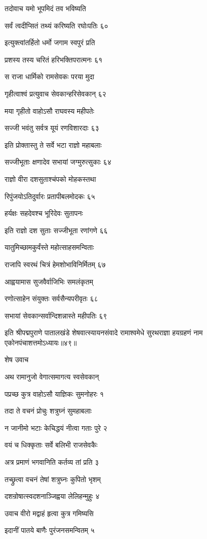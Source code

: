 तदोवाच यमो भूपमिदं तव भविष्यति

सर्वं त्वदीप्सितं तथ्यं करिष्यति रघोःपतिः ६०

इत्युक्त्वांतर्हितो धर्मो जगाम स्वपुरं प्रति

प्रशस्य तस्य चरितं हरिभक्तिपरात्मनः ६१

स राजा धार्मिको रामसेवकः परया मुदा

गृहीत्वाश्वं प्रत्युवाच सेवकान्हरिसेवकान् ६२

मया गृहीतो वाहोऽसौ राघवस्य महीपतेः

सज्जी भवंतु सर्वत्र यूयं रणविशारदाः ६३

इति प्रोक्तास्तु ते सर्वे भटा राज्ञो महाबलाः

सज्जीभूताः क्षणादेव सभायां जग्मुरुत्सुकाः ६४

राज्ञो वीरा दशसुताश्चंपको मोहकस्तथा

रिपुंजयोऽतिदुर्वारः प्रतापीबलमोदकः ६५

हर्यक्षः सहदेवश्च भूरिदेवः सुतापनः

इति राज्ञो दश सुताः सज्जीभूता रणांगणे ६६

यातुमिच्छामकुर्वंस्ते महोत्साहसमन्विताः

राजापि स्वरथं चित्रं हेमशोभाविनिर्मितम् ६७

आह्वयामास सुजवैर्वाजिभिः समलंकृतम्

रणोत्साहेन संयुक्तः सर्वसैन्यपरीवृतः ६८

सभायां सेवकान्सर्वान्दिशन्नास्ते महीपतिः ६९

इति श्रीपद्मपुराणे पातालखंडे शेषवात्स्यायनसंवादे रामाश्वमेधे सुरथराज्ञा हयग्रहणं नाम एकोनपंचाशत्तमोऽध्यायः॥४९॥


शेष उवाच

अथ रामानुजो वेगात्समागत्य स्वसेवकान्

पप्रच्छ कुत्र वाहोऽसौ याज्ञिकः सुमनोहरः १

तदा ते वचनं प्रोचुः शत्रुघ्नं सुमहाबलाः

न जानीमो भटाः केचिद्धयं नीत्वा गताः पुरे २

वयं च धिक्कृताः सर्वे बलिभी राजसेवकैः

अत्र प्रमाणं भगवानिति कर्तव्य तां प्रति ३

तच्छ्रुत्वा वचनं तेषां शत्रुघ्नः कुपितो भृशम्

दशन्रोषात्स्वदशनाञ्जिह्वया लेलिहन्मुहुः ४

उवाच वीरो मद्वाहं हृत्वा कुत्र गमिष्यसि

इदानीं पातये बाणैः पुरंजनसमन्वितम् ५

